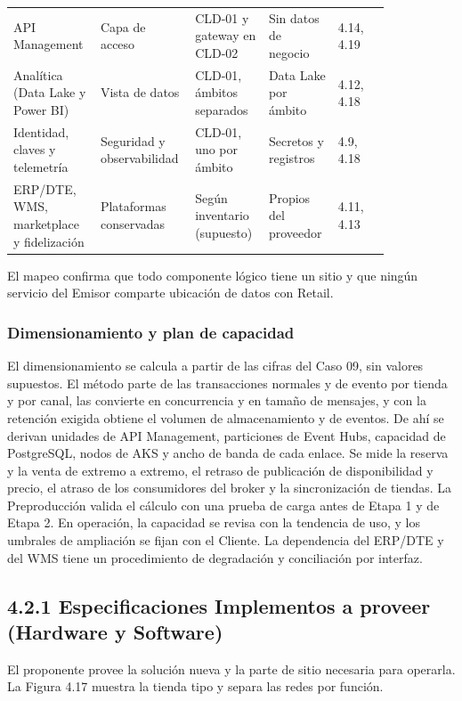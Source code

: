 \documentclass[11pt]{article}
\begin{document}
\begin{longtable}{@{}p{0.20\linewidth}p{0.17\linewidth}p{0.18\linewidth}p{0.16\linewidth}p{0.13\linewidth}@{}}
API Management & Capa de acceso & CLD-01 y gateway en CLD-02 & Sin datos de negocio & 4.14, 4.19 \\
Analítica (Data Lake y Power BI) & Vista de datos & CLD-01, ámbitos separados & Data Lake por ámbito & 4.12, 4.18 \\
Identidad, claves y telemetría & Seguridad y observabilidad & CLD-01, uno por ámbito & Secretos y registros & 4.9, 4.18 \\
ERP/DTE, WMS, marketplace y fidelización & Plataformas conservadas & Según inventario (supuesto) & Propios del proveedor & 4.11, 4.13 \\
\end{longtable}

El mapeo confirma que todo componente lógico tiene un sitio y que ningún servicio del Emisor comparte ubicación de datos con Retail.

\subsubsection{Dimensionamiento y plan de capacidad}

El dimensionamiento se calcula a partir de las cifras del Caso 09, sin valores supuestos. El método parte de las transacciones normales y de evento por tienda y por canal, las convierte en concurrencia y en tamaño de mensajes, y con la retención exigida obtiene el volumen de almacenamiento y de eventos. De ahí se derivan unidades de API Management, particiones de Event Hubs, capacidad de PostgreSQL, nodos de AKS y ancho de banda de cada enlace. Se mide la reserva y la venta de extremo a extremo, el retraso de publicación de disponibilidad y precio, el atraso de los consumidores del broker y la sincronización de tiendas. La Preproducción valida el cálculo con una prueba de carga antes de Etapa 1 y de Etapa 2. En operación, la capacidad se revisa con la tendencia de uso, y los umbrales de ampliación se fijan con el Cliente. La dependencia del ERP/DTE y del WMS tiene un procedimiento de degradación y conciliación por interfaz.

\subsection{4.2.1 Especificaciones Implementos a proveer (Hardware y Software)}

El proponente provee la solución nueva y la parte de sitio necesaria para operarla. La Figura 4.17 muestra la tienda tipo y separa las redes por función.
\end{document}
